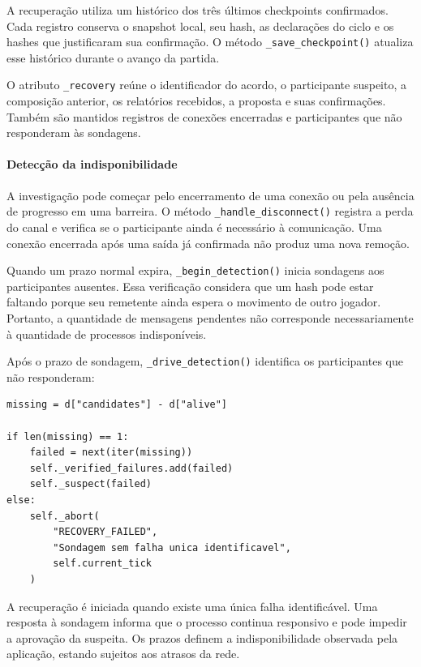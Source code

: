 \documentclass[11pt,a4paper]{article}
\begin{document}
A recuperação utiliza um histórico dos três últimos checkpoints confirmados. Cada registro conserva o snapshot local, seu hash, as declarações do ciclo e os hashes que justificaram sua confirmação. O método \texttt{\_save\_checkpoint()} atualiza esse histórico durante o avanço da partida.

O atributo \texttt{\_recovery} reúne o identificador do acordo, o participante suspeito, a composição anterior, os relatórios recebidos, a proposta e suas confirmações. Também são mantidos registros de conexões encerradas e participantes que não responderam às sondagens.

\paragraph{Detecção da indisponibilidade}

A investigação pode começar pelo encerramento de uma conexão ou pela ausência de progresso em uma barreira. O método \texttt{\_handle\_disconnect()} registra a perda do canal e verifica se o participante ainda é necessário à comunicação. Uma conexão encerrada após uma saída já confirmada não produz uma nova remoção.

Quando um prazo normal expira, \texttt{\_begin\_detection()} inicia sondagens aos participantes ausentes. Essa verificação considera que um hash pode estar faltando porque seu remetente ainda espera o movimento de outro jogador. Portanto, a quantidade de mensagens pendentes não corresponde necessariamente à quantidade de processos indisponíveis.

Após o prazo de sondagem, \texttt{\_drive\_detection()} identifica os participantes que não responderam:

\par\smallskip
\noindent
\begin{minipage}{\linewidth}
\begin{verbatim}
missing = d["candidates"] - d["alive"]

if len(missing) == 1:
    failed = next(iter(missing))
    self._verified_failures.add(failed)
    self._suspect(failed)
else:
    self._abort(
        "RECOVERY_FAILED",
        "Sondagem sem falha unica identificavel",
        self.current_tick
    )
\end{verbatim}
\end{minipage}
\par\smallskip

A recuperação é iniciada quando existe uma única falha identificável. Uma resposta à sondagem informa que o processo continua responsivo e pode impedir a aprovação da suspeita. Os prazos definem a indisponibilidade observada pela aplicação, estando sujeitos aos atrasos da rede.
\end{document}
